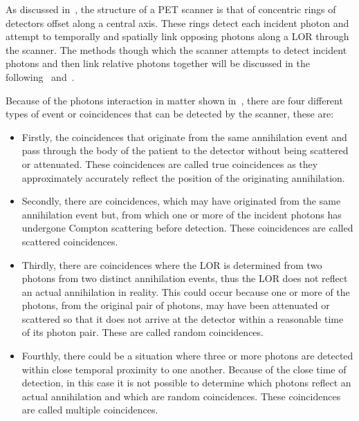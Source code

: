             As discussed in~, the structure of a \gls{PET} scanner is that of concentric rings of detectors offset along a central axis. These rings detect each incident photon and attempt to temporally and spatially link opposing photons along a \gls{LOR} through the scanner. The methods though which the scanner attempts to detect incident photons and then link relative photons together will be discussed in the following~ and~.
            
            Because of the photons interaction in matter shown in~, there are four different types of event or coincidences that can be detected by the scanner, these are:
            
            \begin{itemize}
                \item Firstly, the coincidences that originate from the same annihilation event and pass through the body of the patient to the detector without being scattered or attenuated. These coincidences are called true coincidences as they approximately accurately reflect the position of the originating annihilation.
                
                \item Secondly, there are coincidences, which may have originated from the same annihilation event but, from which one or more of the incident photons has undergone Compton scattering before detection. These coincidences are called scattered coincidences.
                
                \item Thirdly, there are coincidences where the \gls{LOR} is determined from two photons from two distinct annihilation events, thus the \gls{LOR} does not reflect an actual annihilation in reality. This could occur because one or more of the photons, from the original pair of photons, may have been attenuated or scattered so that it does not arrive at the detector within a reasonable time of its photon pair. These are called random coincidences.
                
                \item Fourthly, there could be a situation where three or more photons are detected within close temporal proximity to one another. Because of the close time of detection, in this case it is not possible to determine which photons reflect an actual annihilation and which are random coincidences. These coincidences are called multiple coincidences.
            \end{itemize}
            
